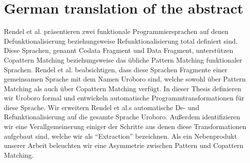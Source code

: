 \chapter{German translation of the abstract}
\label{ch:appb}

Rendel et al. präsentieren zwei funktionale Programmiersprachen auf denen Defunktionalisierung beziehungsweise Refunktionalisierung total definiert sind. Diese Sprachen, genannt Codata Fragment und Data Fragment, unterstützen Copattern Matching beziehungsweise das übliche Pattern Matching funktionaler Sprachen. Rendel et al. beabsichtigen, dass diese Sprachen Fragmente einer gemeinsamen Sprache mit dem Namen Uroboro sind, welche sowohl über Pattern Matching als auch über Copattern Matching verfügt. In dieser Thesis definieren wir Uroboro formal und entwickeln automatische Programmtransformationen für diese Sprache. Wir erweitern Rendel et al.s automatische De- und Refunktionalisierung auf die gesamte Sprache Uroboro. Außerdem identifizieren wir eine Verallgemeinerung einiger der Schritte aus denen diese Transformationen aufgebaut sind, welche wir als ``Extraction'' bezeichnen. Als ein Nebenprodukt unserer Arbeit beleuchten wir eine Asymmetrie zwischen Pattern und Copattern Matching.
